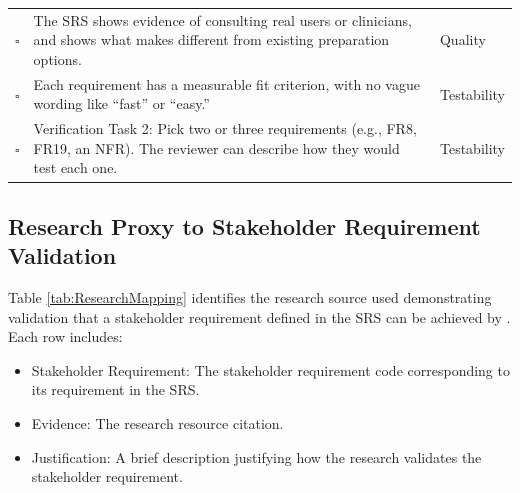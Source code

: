\documentclass[10pt,titlepage]{article}
\newcommand{\chk}{$\square$}
\begin{document}
\begin{longtable}{@{}>{\raggedright\arraybackslash}p{} >{\raggedright\arraybackslash}p{} >{\raggedright\arraybackslash}p{}@{}}
\chk & The SRS shows evidence of consulting real users or clinicians, and shows what makes \progname{} 
different from existing preparation options.
& Quality \\

\chk & Each requirement has a measurable fit criterion, with no vague wording like “fast” or “easy.”
& Testability \\

\chk & Verification Task 2: Pick two or three requirements (e.g., FR8, FR19, an NFR). The 
reviewer can describe how they would test each one.
& Testability \\

\end{longtable}

\subsection{Research Proxy to Stakeholder Requirement Validation}\label{sec:ResearchValidation}

Table \ref{tab:ResearchMapping} identifies the research source used demonstrating validation that a stakeholder requirement defined in the SRS can be 
achieved by \progname{}. Each row includes:
\begin{itemize}
  \item Stakeholder Requirement: The stakeholder requirement code corresponding to its requirement in the SRS.
  \item Evidence: The research resource citation.
  \item Justification: A brief description justifying how the research validates the stakeholder requirement.
\end{itemize}
\end{document}

